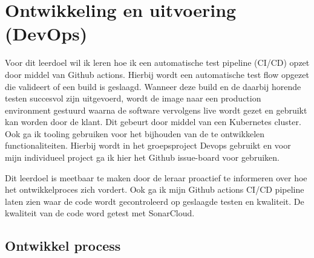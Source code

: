 
\section{Ontwikkeling en uitvoering (DevOps)}\label{sec:ontwikkeling-en-uitvoering-(devops)}


Voor dit leerdoel wil ik leren hoe ik een automatische test pipeline (CI/CD) opzet door middel van Github actions.
Hierbij wordt een automatische test flow opgezet die valideert of een build is geslaagd.
Wanneer deze build en de daarbij horende testen succesvol zijn uitgevoerd, wordt de image naar een production environment gestuurd waarna
de software vervolgens live wordt gezet en gebruikt kan worden door de klant.
Dit gebeurt door middel van een Kubernetes cluster.
Ook ga ik tooling gebruiken voor het bijhouden van de te ontwikkelen functionaliteiten.
Hierbij wordt in het groepsproject Devops gebruikt en voor mijn individueel project ga ik hier het Github issue-board voor gebruiken.

Dit leerdoel is meetbaar te maken door de leraar proactief te informeren over hoe het ontwikkelproces zich vordert.
Ook ga ik mijn Github actions CI/CD pipeline laten zien waar de code wordt gecontroleerd op geslaagde testen en kwaliteit.
De kwaliteit van de code word getest met SonarCloud.


\subsection{Ontwikkel process}
